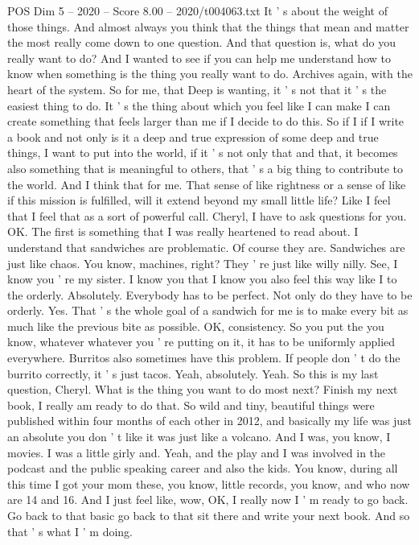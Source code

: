 \begin{textsample}{POS Dim 5 – 2020 – Score 8.00 – 2020/t004063.txt}
It ' s about the weight of those things.
And almost always you think that the things that mean and matter the most really come down to one question.
And that question is, what do you really want to do?
And I wanted to see if you can help me understand how to know when something is the thing you really want to do.
Archives again, with the heart of the system.
So for me, that Deep is wanting, it ' s not that it ' s the easiest thing to do.
It ' s the thing about which you feel like I can make I can create something that feels larger than me if I decide to do this.
So if I if I write a book and not only is it a deep and true expression of some deep and true things, I want to put into the world, if it ' s not only that and that, it becomes also something that is meaningful to others, that ' s a big thing to contribute to the world.
And I think that for me.
That sense of like rightness or a sense of like if this mission is fulfilled, will it extend beyond my small little life?
Like I feel that I feel that as a sort of powerful call.
Cheryl, I have to ask questions for you.
OK.
The first is something that I was really heartened to read about.
I understand that sandwiches are problematic.
Of course they are.
Sandwiches are just like chaos.
You know, machines, right?
They ' re just like willy nilly.
See, I know you ' re my sister.
I know you that I know you also feel this way like I to the orderly.
Absolutely.
Everybody has to be perfect.
Not only do they have to be orderly.
Yes.
That ' s the whole goal of a sandwich for me is to make every bit as much like the previous bite as possible.
OK, consistency.
So you put the you know, whatever whatever you ' re putting on it, it has to be uniformly applied everywhere.
Burritos also sometimes have this problem.
If people don ' t do the burrito correctly, it ' s just tacos.
Yeah, absolutely.
Yeah.
So this is my last question, Cheryl.
What is the thing you want to do most next?
Finish my next book, I really am ready to do that.
So wild and tiny, beautiful things were published within four months of each other in 2012, and basically my life was just an absolute you don ' t like it was just like a volcano.
And I was, you know, I movies.
I was a little girly and.
Yeah, and the play and I was involved in the podcast and the public speaking career and also the kids.
You know, during all this time I got your mom these, you know, little records, you know, and who now are 14 and 16.
And I just feel like, wow, OK, I really now I ' m ready to go back.
Go back to that basic go back to that sit there and write your next book.
And so that ' s what I ' m doing.

\end{textsample}
